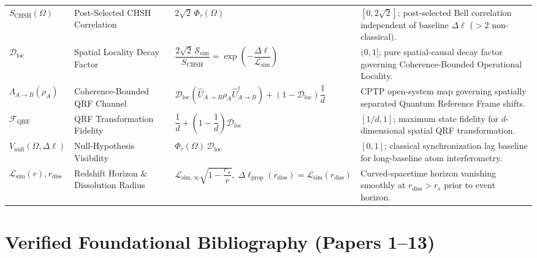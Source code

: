 \documentclass[11pt,a4paper]{article}
\begin{document}
\begin{longtable}{>{\raggedright\arraybackslash}p{2.2cm} >{\raggedright\arraybackslash}p{3.4cm} >{\raggedright\arraybackslash}p{4.6cm} >{\raggedright\arraybackslash}p{5.2cm}}
$S_{\mathrm{CHSH}}(\Omega)$ & Post-Selected CHSH Correlation & $2\sqrt{2}\,\Phi_\tau(\Omega)$ & $[0, 2\sqrt{2}]$; post-selected Bell correlation independent of baseline $\Delta\ell$ ($>2$ non-classical). \\[1.2ex]
$\mathcal{D}_{\mathrm{loc}}$ & Spatial Locality Decay Factor & $\dfrac{2\sqrt{2}\,\mathcal{S}_{\mathrm{sim}}}{S_{\mathrm{CHSH}}} = \exp\!\left(-\dfrac{\Delta\ell}{\mathcal{L}_{\mathrm{sim}}}\right)$ & $(0, 1]$; pure spatial-causal decay factor governing Coherence-Bounded Operational Locality. \\[1.4ex]
$\Lambda_{A\to B}(\rho_A)$ & Coherence-Bounded QRF Channel & $\mathcal{D}_{\mathrm{loc}}(\hat{U}_{A\to B}\rho_A\hat{U}_{A\to B}^\dagger) + (1-\mathcal{D}_{\mathrm{loc}})\dfrac{\mathbb{I}}{d}$ & CPTP open-system map governing spatially separated Quantum Reference Frame shifts. \\[1.4ex]
$\mathcal{F}_{\mathrm{QRF}}$ & QRF Transformation Fidelity & $\dfrac{1}{d} + \left(1 - \dfrac{1}{d}\right)\mathcal{D}_{\mathrm{loc}}$ & $[1/d, 1]$; maximum state fidelity for $d$-dimensional spatial QRF transformation. \\[1.4ex]
$V_{\mathrm{null}}(\Omega,\Delta\ell)$ & Null-Hypothesis Visibility & $\Phi_\tau(\Omega)\,\mathcal{D}_{\mathrm{loc}}$ & $[0, 1]$; classical synchronization lag baseline for long-baseline atom interferometry. \\[1.2ex]
$\mathcal{L}_{\mathrm{sim}}(r), r_{\mathrm{diss}}$ & Redshift Horizon \& Dissolution Radius & $\mathcal{L}_{\mathrm{sim},\infty}\sqrt{1 - \dfrac{r_s}{r}},\; \Delta\ell_{\mathrm{prop}}(r_{\mathrm{diss}}) = \mathcal{L}_{\mathrm{sim}}(r_{\mathrm{diss}})$ & Curved-spacetime horizon vanishing smoothly at $r_{\mathrm{diss}} > r_s$ prior to event horizon. \\
\end{longtable}
\normalsize

\section{Verified Foundational Bibliography (Papers 1--13)}
\end{document}
